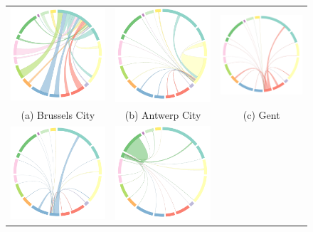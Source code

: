 \documentclass{sig-alternate}
\begin{document}
\begin{figure}[t]
\begin{tabular}{ccc}
  \includegraphics[width=.33\textwidth]{wd-brussels.pdf}& 
  \includegraphics[width=.33\textwidth]{wd-antwerp.pdf}& 
  \includegraphics[width=.33\textwidth]{wd-gent.pdf}\\
  (a) Brussels City&(b) Antwerp City&(c) Gent\\[6pt]
  \includegraphics[width=.33\textwidth]{wd-leuven.pdf}& 
  \includegraphics[width=.33\textwidth]{wd-liege.pdf}& 

\end{tabular}
\end{figure}
\end{document}
